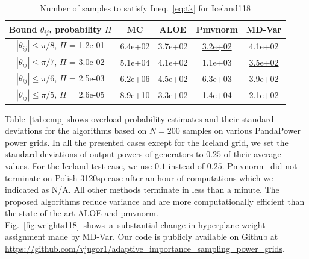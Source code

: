 \begin{table}[ht]
\centering
\caption{Number of samples to satisfy Ineq.~\eqref{eq:tk} 
 for Iceland118}
 \begin{tabular}{|c|c|c|c|c|} 
 \toprule
 \hspace{-2mm}Bound ${\bar\theta}_{ij}$, probability $\Pi$ & MC & ALOE & Pmvnorm & MD-Var\\
 \hline
  \hspace{-2mm}$|{\theta}_{ij}| \le \pi/8$, $\Pi$ = 1.2e-01 & 6.4e+02 & 3.7e+02 & \underline{3.2e+02} & 4.1e+02\\
  \hspace{-2mm}$|{\theta}_{ij}| \le \pi/7$, $\Pi$ = 3.0e-02 & 5.1e+04 & 4.1e+02 & 1.1e+03 & \underline{3.5e+02}\\
  \hspace{-2mm}$|{\theta}_{ij}| \le \pi/6$, $\Pi$ = 2.5e-03  & 6.2e+06 & 4.5e+02 & 6.3e+03 & \underline{3.9e+02} \\
  \hspace{-2mm}$|{\theta}_{ij}| \le \pi/5$, $\Pi$ = 2.6e-05  & 8.9e+10 & 3.3e+02 & 1.4e+04 & \underline{2.1e+02}\\
  \bottomrule
 \end{tabular}
 \vspace{-3mm}\label{tab:sample-compX}
\end{table}


Table~\ref{tab:emp} shows overload probability estimates and their standard deviations for the algorithms based on $N = 200$ samples on various PandaPower~\cite{pandapower.2018} power grids. In all the presented cases except for the Iceland grid, we set the standard deviations of output powers of generators to $0.25$ of their average values. For the Iceland test case, we use $0.1$ instead of $0.25.$ 
Pmvnorm~\cite{genz2020package} did not terminate on Polish 3120sp case after an hour of computations which we indicated as N/A. All other methods terminate in less than a minute. The proposed algorithms reduce variance and are more computationally efficient than the state-of-the-art ALOE and pmvnorm. Fig.~\ref{fig:weights118}~shows~a~substantial change in hyperplane weight assignment made by MD-Var. Our code is publicly available on Github at \url{https://github.com/vjugor1/adaptive_importance_sampling_power_grids}. 


